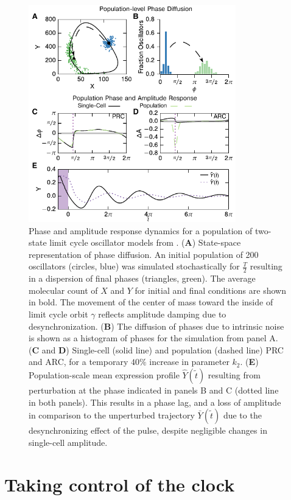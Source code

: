 \begin{figure}[p] 
    \begin{center}
        \includegraphics[width=90mm]{chap1/figures/figure_3_population.pdf}
    \end{center}
    \caption{Phase and amplitude response dynamics for a population of two-state limit cycle oscillator models from \cite{Novak2008}.
    (\textbf{A}) State-space representation of phase diffusion. An initial population of 200 oscillators (circles, blue) was simulated stochastically for $\frac{T}{2}$ resulting in a dispersion of final phases (triangles, green). The average molecular count of $X$ and $Y$ for initial and final conditions are shown in bold. The movement of the center of mass toward the inside of limit cycle orbit $\gamma$ reflects amplitude damping due to desynchronization.
    (\textbf{B}) The diffusion of phases due to intrinsic noise is shown as a histogram of phases for the simulation from panel A.
    (\textbf{C} and \textbf{D}) Single-cell (solid line) and population (dashed line) PRC and ARC, for a temporary $40\%$ increase in parameter $k_2$. 
    (\textbf{E}) Population-scale mean expression profile $\hat{Y}(\tilde{t})$ resulting from perturbation at the phase indicated in panels B and C (dotted line in both panels).
    This results in a phase lag, and a loss of amplitude in comparison to the unperturbed trajectory $\bar{Y}(\tilde{t})$ due to the desynchronizing effect of the pulse, despite negligible changes in single-cell amplitude. 
\label{fig:pop}}
\end{figure}


\section{Taking control of the clock}

